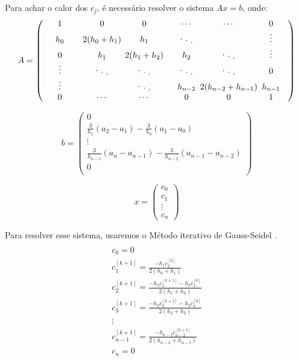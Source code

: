 \documentclass[a4paper,10pt]{article}
\newcommand{\diagentry}[1]{\mathmakebox[4em]{#1}}
\newcommand{\xddots}{%
 \raise 3pt \hbox {.}
  \mkern 6mu
  \raise 1pt \hbox {.}
  \mkern 6mu
  \raise -1pt \hbox {.}
}
\begin{document}
  Para achar o calor dos $c_j$, é necessário resolver o sistema $Ax=b$, onde: 
  \begin{equation}
   A = 
   \begin{pmatrix}
    \diagentry{1} & \diagentry{0}&0&\cdots&\cdots&0\\
    \diagentry{h_0} & \diagentry{2(h_0+h_1)} & \diagentry{h_1}&\diagentry{\xddots}&&\vdots\\
    0 &\diagentry {h_1} & \diagentry{2(h_1+h_2)} & \diagentry{h_2}&\diagentry{\xddots}&\vdots\\
    \vdots & \diagentry{\xddots} & \diagentry{\xddots} & \diagentry{\xddots} & \diagentry{\xddots}&0\\
    \vdots && \diagentry{\xddots} & \diagentry {h_{n-2}} & \diagentry{2(h_{n-2}+h_{n-1})} & \diagentry{h_{n-1}}\\
    0 &\cdots&\cdots&0& 0 & 1\\
   \end{pmatrix}
   \label{eq:sistema}
  \end{equation}
  
  \begin{equation}
   b = 
   \begin{pmatrix}
    0\\
    \frac{3}{h_1}(a_2-a_1)-\frac{3}{h_0}(a_1-a_0)\\
    \vdots\\
    \frac{3}{h_{n-1}}(a_n-a_{n-1})-\frac{3}{h_{n-2}}(a_{n-1}-a_{n-2})\\
    0\\
   \end{pmatrix}
  \end{equation}
  
  \begin{equation}
    x = 
      \begin{pmatrix}
	c_0\\
	c_1\\
	\vdots\\
	c_n
      \end{pmatrix}
   \end{equation}

Para resolver esse sistema, usaremos o Método iterativo de Gauss-Seidel \cite{humes}. 
  \begin{multline}
\\ c_0 = 0 \\
c_1^{[k+1]} = \frac{-h_1c_2^{[k]}}{2(h_0+h_1)} \\
c_2^{[k+1]} = \frac{-h_1c_1^{[k+1]}-h_2c_3^{[k]}}{2(h_1+h_2)} \\
c_3^{[k+1]} = \frac{-h_2c_2^{[k+1]}-h_3c_4^{[k]}}{2(h_2+h_3)} \\
\vdots \\
c_{n-1}^{[k+1]} = \frac{-h_{n-2}c_{n-2}^{[k+1]}}{2(h_{n-2}+h_{n-1})} \\
c_n = 0 \\
  \end{multline}
  
\end{document}
